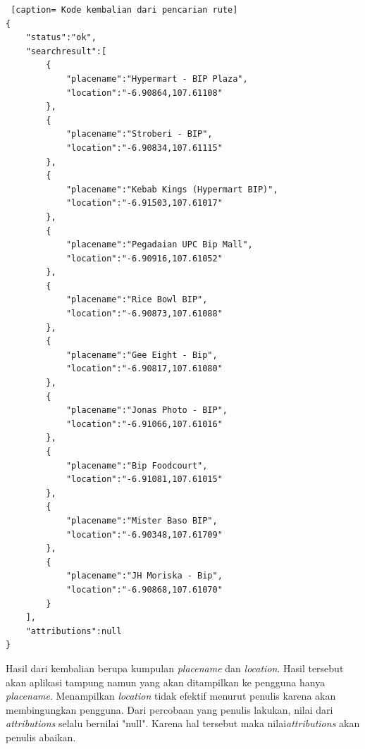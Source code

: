 \begin{lstlisting} [caption= Kode kembalian dari pencarian rute]
{ 
	"status":"ok",
	"searchresult":[
		{
			"placename":"Hypermart - BIP Plaza",
			"location":"-6.90864,107.61108"
		},
		{
			"placename":"Stroberi - BIP",
			"location":"-6.90834,107.61115"
		},
		{
			"placename":"Kebab Kings (Hypermart BIP)",
			"location":"-6.91503,107.61017"
		},
		{
			"placename":"Pegadaian UPC Bip Mall",
			"location":"-6.90916,107.61052"
		},
		{
			"placename":"Rice Bowl BIP",
			"location":"-6.90873,107.61088"
		},
		{	
			"placename":"Gee Eight - Bip",
			"location":"-6.90817,107.61080"
		},
		{
			"placename":"Jonas Photo - BIP",
			"location":"-6.91066,107.61016"
		},
		{
			"placename":"Bip Foodcourt",
			"location":"-6.91081,107.61015"
		},
		{
			"placename":"Mister Baso BIP",
			"location":"-6.90348,107.61709"
		},
		{
			"placename":"JH Moriska - Bip",
			"location":"-6.90868,107.61070"
		}
	],
	"attributions":null
}
\end{lstlisting}

\hspace{0.5cm} Hasil dari kembalian berupa kumpulan \textit{placename} dan \textit{location}. Hasil tersebut akan aplikasi tampung namun yang akan ditampilkan ke pengguna hanya \textit{placename}. Menampilkan \textit{location} tidak efektif menurut penulis karena akan membingungkan pengguna. Dari percobaan yang penulis lakukan, nilai dari \textit{attributions} selalu bernilai "null". Karena hal tersebut maka nilai\textit{attributions} akan penulis abaikan.

